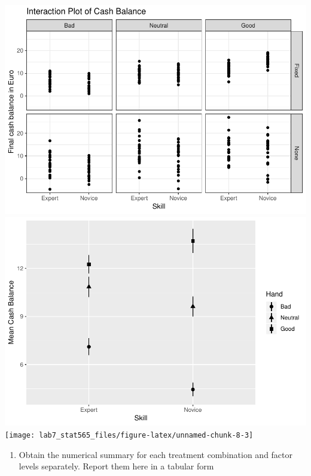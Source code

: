 \documentclass[]{article}
\providecommand{\tightlist}{%
  \setlength{\itemsep}{0pt}\setlength{\parskip}{0pt}}
\begin{document}
\includegraphics[width=0.3\linewidth]{lab7_stat565_files/figure-latex/unnamed-chunk-8-1}
\includegraphics[width=0.3\linewidth]{lab7_stat565_files/figure-latex/unnamed-chunk-8-2}
\texttt{[image: lab7\_stat565\_files/figure-latex/unnamed-chunk-8-3]}

\begin{enumerate}
\def\labelenumi{(\alph{enumi})}
\setcounter{enumi}{1}
\tightlist
\item
  \textcolor[rgb]{0.5,0.5,0.5}{Obtain the numerical summary for each treatment combination and factor levels separately. Report them here in a tabular form}
\end{enumerate}
\end{document}
